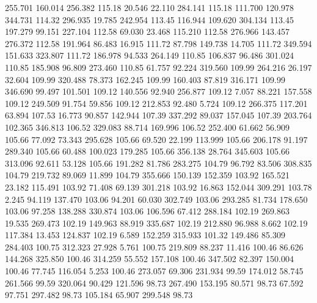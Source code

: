  255.701  160.014  256.382       115.18
  20.546   22.110  284.141       115.18
 111.700  120.978  344.731       114.32
 296.935   19.785  242.954       113.45
 116.944  109.620  304.134       113.45
 197.279   99.151  227.104       112.58
  69.030   23.468  115.210       112.58
 276.966  143.457  276.372       112.58
 191.964   86.483   16.915       111.72
  87.798  149.738   14.705       111.72
 349.594  151.633  323.807       111.72
 186.978   94.533  264.149       110.85
 106.837   96.486  301.024       110.85
 185.908   96.809  273.460       110.85
  61.757   92.224  319.560       109.99
 264.216   26.197   32.604       109.99
 320.488   78.373  162.245       109.99
 160.403   87.819  316.171       109.99
 346.690   99.497  101.501       109.12
 140.556   92.940  256.877       109.12
   7.057   88.221  157.558       109.12
 249.509   91.754   59.856       109.12
 212.853   92.480    5.724       109.12
 266.375  117.201   63.894       107.53
  16.773   90.857  142.944       107.39
 337.292   89.037  157.045       107.39
 203.764  102.365  346.813       106.52
 329.083   88.714  169.996       106.52
 252.400   61.662   56.909       105.66
  77.092   73.343  295.628       105.66
  69.520   22.199  113.999       105.66
 206.178   91.197  289.340       105.66
  60.488  100.023  179.285       105.66
 356.138   28.764  345.603       105.66
 313.096   92.611   53.128       105.66
 191.282   81.786  283.275       104.79
  96.792   83.506  308.835       104.79
 219.732   89.069   11.899       104.79
 355.666  150.139  152.359       103.92
 165.521   23.182  115.491       103.92
  71.408   69.139  301.218       103.92
  16.863  152.044  309.291       103.78
   2.245   94.119  137.470       103.06
  94.201   60.030  302.749       103.06
 293.285   81.734  178.650       103.06
  97.258  138.288  330.874       103.06
 106.596   67.412  288.184       102.19
 269.863   19.535  269.473       102.19
 149.963   88.919  335.687       102.19
 212.880   96.988    8.662       102.19
 117.384   13.453  124.837       102.19
   6.589  152.259  315.933       101.32
 149.486   85.309  284.403       100.75
 312.323   27.928    5.761       100.75
 219.809   88.237   11.416       100.46
  86.626  144.268  325.850       100.46
 314.259   55.552  157.108       100.46
 347.502   82.397  150.004       100.46
  77.745  116.054    5.253       100.46
 273.057   69.306  231.934        99.59
 174.012   58.745  261.566        99.59
 320.064   90.429  121.596        98.73
 267.490  153.195   80.571        98.73
  67.592   97.751  297.482        98.73
 105.184   65.907  299.548        98.73
